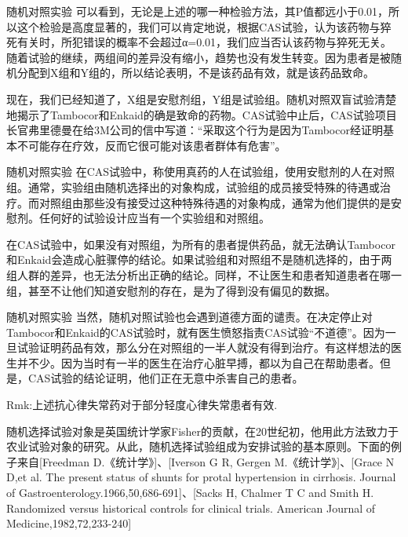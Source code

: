 	\begin{frame}{随机对照实验}
		可以看到，无论是上述的哪一种检验方法，其P值都远小于0.01，所以这个检验是高度显著的，我们可以肯定地说，根据CAS试验，认为该药物与猝死有关时，所犯错误的概率不会超过α=0.01，我们应当否认该药物与猝死无关。随着试验的继续，两组间的差异没有缩小，趋势也没有发生转变。因为患者是被随机分配到X组和Y组的，所以结论表明，不是该药品有效，就是该药品致命。
		
		现在，我们已经知道了，X组是安慰剂组，Y组是试验组。随机对照双盲试验清楚地揭示了Tambocor和Enkaid的确是致命的药物。CAS试验中止后，CAS试验项目长官弗里德曼在给3M公司的信中写道：“采取这个行为是因为Tambocor经证明基本不可能存在疗效，反而它很可能对该患者群体有危害”。
		
	\end{frame}

	\begin{frame}{随机对照实验}
		在CAS试验中，称使用真药的人在试验组，使用安慰剂的人在对照组。通常，实验组由随机选择出的对象构成，试验组的成员接受特殊的待遇或治疗。而对照组由那些没有接受过这种特殊待遇的对象构成，通常为他们提供的是安慰剂。任何好的试验设计应当有一个实验组和对照组。
		
		在CAS试验中，如果没有对照组，为所有的患者提供药品，就无法确认Tambocor和Enkaid会造成心脏骤停的结论。如果试验组和对照组不是随机选择的，由于两组人群的差异，也无法分析出正确的结论。同样，不让医生和患者知道患者在哪一组，甚至不让他们知道安慰剂的存在，是为了得到没有偏见的数据。
	\end{frame}	

	\begin{frame}{随机对照实验}
		当然，随机对照试验也会遇到道德方面的谴责。在决定停止对Tambocor和Enkaid的CAS试验时，就有医生愤怒指责CAS试验“不道德”。因为一旦试验证明药品有效，那么分在对照组的一半人就没有得到治疗。有这样想法的医生并不少。因为当时有一半的医生在治疗心脏早搏，都以为自己在帮助患者。但是，CAS试验的结论证明，他们正在无意中杀害自己的患者。
		
		Rmk:上述抗心律失常药对于部分轻度心律失常患者有效.
		
		随机选择试验对象是英国统计学家Fisher的贡献，在20世纪初，他用此方法致力于农业试验对象的研究。从此，随机选择试验组成为安排试验的基本原则。下面的例子来自[Freedman D.《统计学》]、[Iverson G R, Gergen M.《统计学》]、[Grace N D,et al. The present status of shunts for protal hypertension in cirrhosis. Journal of Gastroenterology.1966,50,686-691]、[Sacks H, Chalmer T C and Smith H. Randomized versus historical controls for clinical trials. American Journal of Medicine,1982,72,233-240]
		
	\end{frame}	
	
